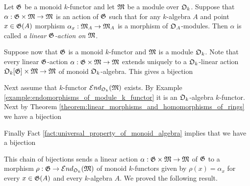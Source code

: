 \begin{definition}
Let ${\mathfrak G}$ be a monoid $k$-functor and let ${\mathfrak M}$ be a module over ${\mathfrak O}_k$. Suppose that $\alpha:{\mathfrak G}\times {\mathfrak M}\rightarrow {\mathfrak M}$ is an action of ${\mathfrak G}$ such that for any $k$-algebra $A$ and point $x\in {\mathfrak G}(A)$ morphism $\alpha_x:{\mathfrak M}_A\rightarrow {\mathfrak M}_A$ is a morphism of ${\mathfrak O}_A$-modules. Then $\alpha$ is called \textit{a linear ${\mathfrak G}$-action on ${\mathfrak M}$}.
\end{definition}
\noindent
Suppose now that ${\mathfrak G}$ is a monoid $k$-functor and ${\mathfrak M}$ is a module ${\mathfrak O}_k$. Note that every linear ${\mathfrak G}$-action $\alpha:{\mathfrak G}\times {\mathfrak M} \rightarrow {\mathfrak M}$ extends uniquely to a ${\mathfrak O}_k$-linear action ${\mathfrak O}_k[{\mathfrak G}]\times {\mathfrak M}\rightarrow {\mathfrak M}$ of monoid ${\mathfrak O}_k$-algebra. This gives a bijection
\begin{center}
\end{center}
Next assume that $k$-functor ${\mathcal E} nd_{{\mathfrak O}_k}({\mathfrak M})$ exists. By Example \ref{example:endomorphisms_of_module_k_functor} it is an ${\mathfrak O}_k$-algebra $k$-functor. Next by Theorem \ref{theorem:linear_morphisms_and_homomorphisms_of_rings} we have a bijection
\begin{center}
\end{center}
Finally Fact \ref{fact:universal_property_of_monoid_algebra} implies that we have a bijection
\begin{center}
\end{center}
This chain of bijections sends a linear action $\alpha:{\mathfrak G}\times {\mathfrak M}\rightarrow {\mathfrak M}$ of ${\mathfrak G}$ to a morphism $\rho:{\mathfrak G}\rightarrow {\mathcal E} nd_{{\mathfrak O}_k}({\mathfrak M})$ of monoid $k$-functors given by $\rho(x) = \alpha_x$ for every $x\in {\mathfrak G}(A)$ and every $k$-algebra $A$. We proved the following result.

